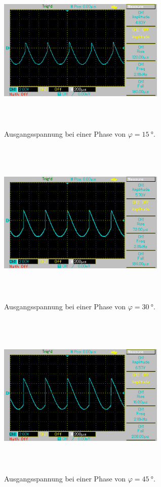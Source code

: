 \begin{figure}
    \centering
    \includegraphics[width=8cm, height=8cm]{build/2.jpg}
    \caption{Ausgangsspannung bei einer Phase von $\varphi = \SI{15}{\degree}$.}
    \label{fig:bild2}
\end{figure}

\begin{figure}
    \centering
    \includegraphics[width=8cm, height=8cm]{build/3.jpg}
    \caption{Ausgangsspannung bei einer Phase von $\varphi = \SI{30}{\degree}$.}
    \label{fig:bild3}
\end{figure}

\begin{figure}
    \centering
    \includegraphics[width=8cm, height=8cm]{build/4.jpg}
    \caption{Ausgangsspannung bei einer Phase von $\varphi = \SI{45}{\degree}$.}
    \label{fig:bild4}
\end{figure}

